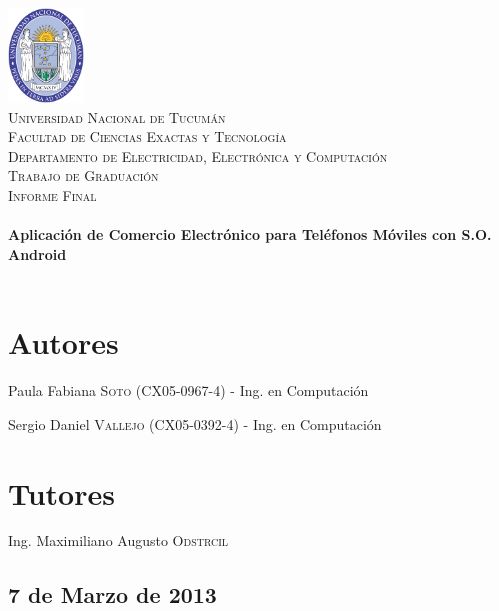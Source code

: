 \begin{titlepage}
 
\begin{center}
 
 
\includegraphics[width=0.15\textwidth]{imagenes/logo-unt.png}\\[0.5cm]
 
\textsc{\LARGE Universidad Nacional de Tucumán}\\[0.5cm]

\textsc{\normalsize Facultad de Ciencias Exactas y Tecnología}\\[0.5cm]

\textsc{\small Departamento de Electricidad, Electrónica y Computación}\\[1cm]
 
\textsc{\Large Trabajo de Graduación}\\[0.2cm]

\textsc{\normalsize Informe Final}\\[0.5cm]
 
 
\HRule \\[0.4cm]
{ \huge \bfseries Aplicación de Comercio Electrónico para Teléfonos Móviles con S.O. Android}\\[0.4cm]
\HRule \\[0.4cm]
 
\end{center} 

\section*{Autores}
Paula Fabiana \textsc{Soto} (CX05-0967-4) - Ing. en Computación

Sergio Daniel \textsc{Vallejo} (CX05-0392-4) - Ing. en Computación

\section*{Tutores}
Ing. Maximiliano Augusto \textsc{Odstrcil}

\begin{center}
\subsection*{7 de Marzo de 2013}
\end{center}

\end{titlepage}